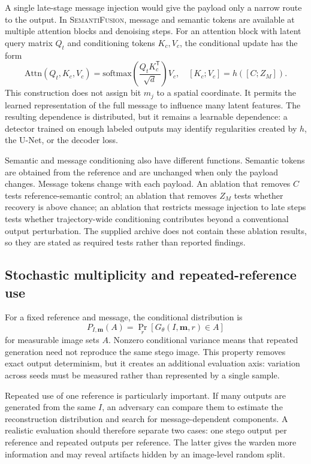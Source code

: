 \documentclass[pdflatex,sn-mathphys-num]{sn-jnl}
\newcommand{\method}{\textsc{SemantiFusion}}
\newcommand{\msg}{\mathbf{m}}
\begin{document}
A single late-stage message injection would give the payload only a narrow route to the output. In \method, message and semantic tokens are available at multiple attention blocks and denoising steps. For an attention block with latent query matrix $Q_t$ and conditioning tokens $K_c,V_c$, the conditional update has the form
\begin{equation}
\mathrm{Attn}(Q_t,K_c,V_c)
=\mathrm{softmax}\!\left(\frac{Q_tK_c^{\mathsf{T}}}{\sqrt{d}}\right)V_c,
\quad [K_c;V_c]=h([C;Z_M]).
\label{eq:crossattention}
\end{equation}
This construction does not assign bit $m_j$ to a spatial coordinate. It permits the learned representation of the full message to influence many latent features. The resulting dependence is distributed, but it remains a learnable dependence: a detector trained on enough labeled outputs may identify regularities created by $h$, the U-Net, or the decoder loss.

Semantic and message conditioning also have different functions. Semantic tokens are obtained from the reference and are unchanged when only the payload changes. Message tokens change with each payload. An ablation that removes $C$ tests reference-semantic control; an ablation that removes $Z_M$ tests whether recovery is above chance; an ablation that restricts message injection to late steps tests whether trajectory-wide conditioning contributes beyond a conventional output perturbation. The supplied archive does not contain these ablation results, so they are stated as required tests rather than reported findings.

\subsection{Stochastic multiplicity and repeated-reference use}

For a fixed reference and message, the conditional distribution is
\begin{equation}
P_{I,\msg}(A)=\Pr_{r}\left[G_{\theta}(I,\msg,r)\in A\right]
\label{eq:conditionaldistribution}
\end{equation}
for measurable image sets $A$. Nonzero conditional variance means that repeated generation need not reproduce the same stego image. This property removes exact output determinism, but it creates an additional evaluation axis: variation across seeds must be measured rather than represented by a single sample.

Repeated use of one reference is particularly important. If many outputs are generated from the same $I$, an adversary can compare them to estimate the reconstruction distribution and search for message-dependent components. A realistic evaluation should therefore separate two cases: one stego output per reference and repeated outputs per reference. The latter gives the warden more information and may reveal artifacts hidden by an image-level random split.
\end{document}
